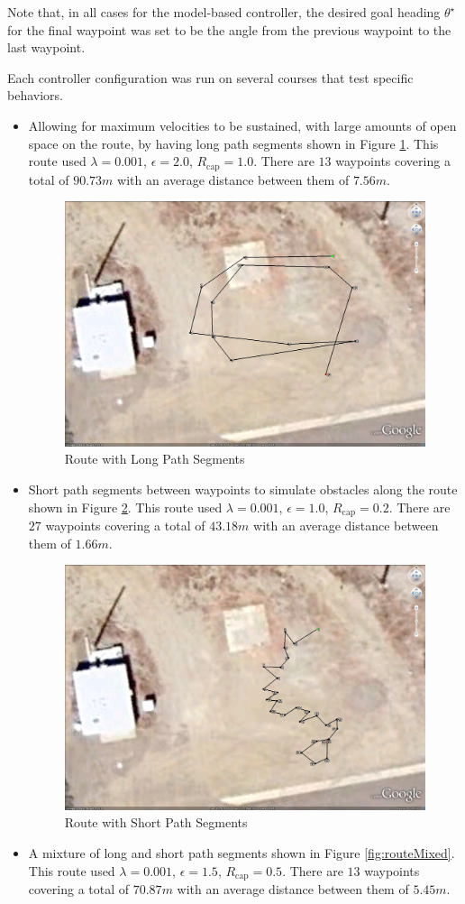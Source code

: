 Note that, in all cases for the model-based controller, the desired goal heading $\theta^\star$ for the final waypoint was set to be the angle from the previous waypoint to the last waypoint.

Each controller configuration was run on several courses that test specific behaviors.
\begin{itemize}
\item Allowing for maximum velocities to be sustained, with large amounts of open space on the route, by having long path segments shown in Figure \ref{fig:routeLong}. This route used $\lambda = 0.001$, $\epsilon = 2.0$, $R_{\text{cap}} = 1.0$. There are $13$ waypoints covering a total of $90.73 m$ with an average distance between them of $7.56 m$.
\begin{figure}[ht!]
	\centering
	\includegraphics[width=.5\textwidth]{images/GE/GELongSegmentsRoute2}
	\caption{Route with Long Path Segments}
	\label{fig:routeLong}
\end{figure}
\item Short path segments between waypoints to simulate obstacles along the route shown in Figure \ref{fig:routeShort}. This route used $\lambda = 0.001$, $\epsilon = 1.0$, $R_{\text{cap}} = 0.2$. There are $27$ waypoints covering a total of $43.18 m$ with an average distance between them of $1.66 m$.
\begin{figure}[ht!]
	\centering
	\includegraphics[width=.5\textwidth]{images/GE/GEShortSegmentsRoute2}
	\caption{Route with Short Path Segments}
	\label{fig:routeShort}
\end{figure}
\item A mixture of long and short path segments shown in Figure \ref{fig:routeMixed}. This route used $\lambda = 0.001$, $\epsilon = 1.5$, $R_{\text{cap}} = 0.5$. There are $13$ waypoints covering a total of $70.87 m$ with an average distance between them of $5.45 m$.

\end{itemize}
